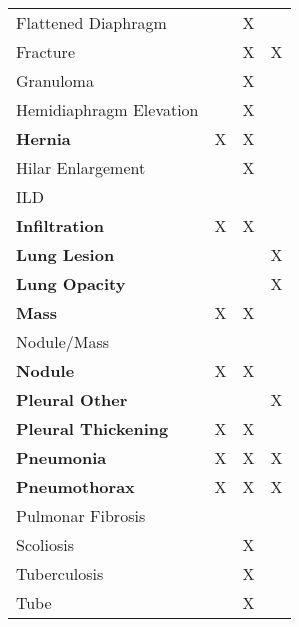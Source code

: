 \documentclass[final,1p,times,authoryear]{elsarticle}
\begin{document}
\begin{table}[htbp]
\begin{tabular}{lccc}
        Flattened Diaphragm       &   & X &   \\
        Fracture                  &   & X & X \\
        Granuloma                 &   & X &   \\
        Hemidiaphragm Elevation   &   & X &   \\
        \textbf{Hernia}           & X & X &   \\
        Hilar Enlargement         &   & X &   \\
        ILD                       &   &   &   \\
        \cellcolor{table_row_highlight}\textbf{Infiltration} &
        \cellcolor{table_row_highlight} X &
        \cellcolor{table_row_highlight} X &
        \cellcolor{table_row_highlight} \\
        \cellcolor{table_row_highlight}\textbf{Lung Lesion} &
        \cellcolor{table_row_highlight} &
        \cellcolor{table_row_highlight} &
        \cellcolor{table_row_highlight} X \\
        \cellcolor{table_row_highlight}\textbf{Lung Opacity} &
        \cellcolor{table_row_highlight} &
        \cellcolor{table_row_highlight} &
        \cellcolor{table_row_highlight} X \\
        \textbf{Mass}               & X & X &   \\
        Nodule/Mass                 &   &   &   \\
        \textbf{Nodule}             & X & X &   \\
        \textbf{Pleural Other}      &   &   & X \\
        \textbf{Pleural Thickening} & X & X &   \\
        \cellcolor{table_row_highlight}\textbf{Pneumonia} &
        \cellcolor{table_row_highlight} X         &
        \cellcolor{table_row_highlight} X         &
        \cellcolor{table_row_highlight} X         \\
        \textbf{Pneumothorax}      & X & X & X \\
        Pulmonar Fibrosis          &   &   &   \\
        Scoliosis                  &   & X &   \\
        Tuberculosis               &   & X &   \\
        Tube                       &   & X &   \\
    \end{tabular}
\end{table}
\end{document}
